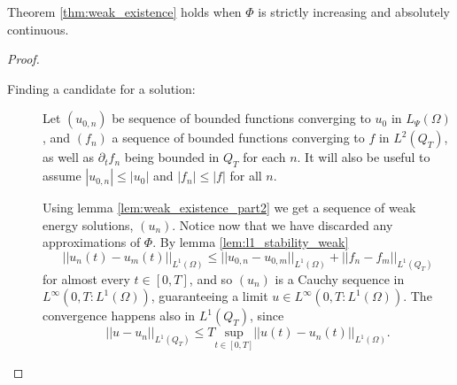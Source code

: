 \documentclass[11pt, a4paper]{article}
\begin{document}
\begin{lemma}
Theorem \ref{thm:weak_existence} holds when $\Phi$ is strictly increasing and absolutely continuous.
\end{lemma}
\begin{proof}



\begin{description}
\item[Finding a candidate for a solution:]
Let $(u_{0,n})$ be sequence of bounded functions converging to $u_0$ in $L_{\Psi}(\Omega)$, and $(f_n)$ a sequence of bounded functions converging to $f$ in $L^2(Q_T)$, as well as $\partial_t f_n$ being bounded in $Q_T$ for each $n$. It will also be useful to assume $|u_{0,n}| \leq |u_0|$ and $|f_n| \leq |f|$ for all $n$.

Using lemma \ref{lem:weak_existence_part2} we get a sequence of weak energy solutions, $(u_n)$. Notice now that we have discarded any approximations of $\Phi$. By lemma \ref{lem:l1_stability_weak}
\begin{equation*}
||u_n(t) - u_m(t)||_{L^1(\Omega)} \leq ||u_{0,n} - u_{0,m}||_{L^1(\Omega)} + ||f_n - f_m||_{L^1(Q_T)}
\end{equation*}
for almost every $t \in [0,T]$, and so $(u_n)$ is a Cauchy sequence in $L^\infty(0,T: L^1(\Omega))$, guaranteeing a limit $u \in L^\infty(0,T: L^1(\Omega))$. The convergence happens also in $L^1(Q_T)$, since
\begin{equation*}
||u - u_n||_{L^1(Q_T)} \leq T\underset{t \in [0,T]}{\mathrm{sup}}||u(t) - u_n(t)||_{L^1(\Omega)}.
\end{equation*}


\end{description}
\end{proof}
\end{document}
